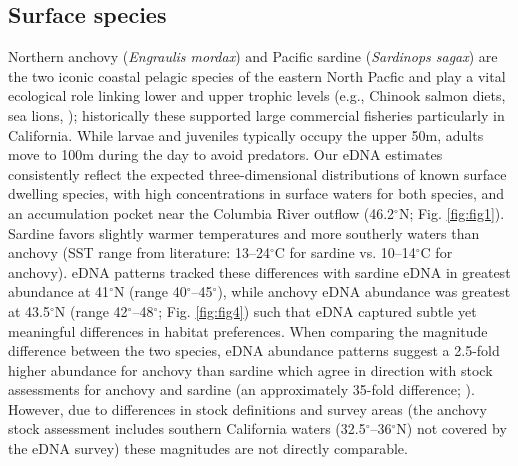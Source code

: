 \documentclass{article}
\begin{document}
\subsection*{Surface species}
Northern anchovy (\textit{Engraulis mordax}) and Pacific sardine (\textit{Sardinops sagax}) are the two iconic coastal pelagic species of the eastern North Pacfic \cite{steinbeck1945} and play a vital ecological role linking lower and upper trophic levels (e.g., Chinook salmon diets, sea lions, \cite{kaplan2019}); historically these supported large commercial fisheries particularly in California. While larvae and juveniles typically occupy the upper 50m, adults move to 100m during the day to avoid predators. Our eDNA estimates consistently reflect the expected three-dimensional distributions of known surface dwelling species, with high concentrations in surface waters for both species\cite{litz2008,parnel2008}, and an accumulation pocket near the Columbia River outflow (46.2$^\circ$N; Fig. \ref{fig:fig1}). Sardine favors slightly warmer temperatures and more southerly waters than anchovy (SST range from literature: 13–24$^\circ$C for sardine vs. 10–14$^\circ$C for anchovy). eDNA patterns tracked these differences with sardine eDNA in greatest abundance at 41$^\circ$N (range 40$^\circ$–45$^\circ$), while anchovy eDNA abundance was greatest at 43.5$^\circ$N (range 42$^\circ$–48$^\circ$; Fig. \ref{fig:fig4}) such that eDNA captured subtle yet meaningful differences in habitat preferences. When comparing the magnitude difference between the two species, eDNA abundance patterns suggest a 2.5-fold higher abundance for anchovy than sardine which agree in direction with stock assessments for anchovy and sardine (an approximately 35-fold difference; \cite{kuriyama2022, kuriyama2022b}). However, due to differences in stock definitions and survey areas (the anchovy stock assessment includes southern California waters (32.5$^\circ$–36$^\circ$N) not covered by the eDNA survey) these magnitudes are not directly comparable.
\end{document}
